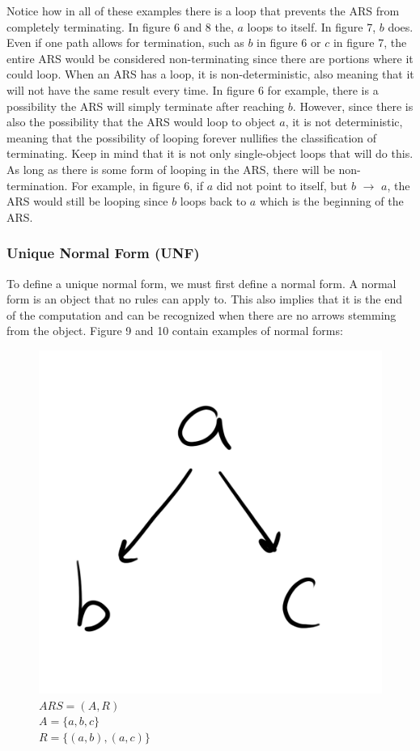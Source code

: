 \documentclass{article}
\begin{document}
\medskip\noindent
Notice how in all of these examples there is a loop that prevents the ARS from completely terminating. In figure 6 and 8 the, $a$ loops to itself. In figure 7, $b$ does. Even if one path allows for termination, such as $b$ in figure 6 or $c$ in figure 7, the entire ARS would be considered non-terminating since there are portions where it could loop. When an ARS has a loop, it is non-deterministic, also meaning that it will not have the same result every time. In figure 6 for example, there is a possibility the ARS will simply terminate after reaching $b$. However, since there is also the possibility that the ARS would loop to object $a$, it is not deterministic, meaning that the possibility of looping forever nullifies the classification of terminating. Keep in mind that it is not only single-object loops that will do this. As long as there is some form of looping in the ARS, there will be non-termination. For example, in figure 6, if $a$ did not point to itself, but $b$ $\rightarrow$ $a$, the ARS would still be looping since $b$ loops back to $a$ which is the beginning of the ARS.


\subsubsection{Unique Normal Form (UNF)}

\medskip\noindent
To define a unique normal form, we must first define a normal form. A normal form is an object that no rules can apply to. This also implies that it is the end of the computation and can be recognized when there are no arrows stemming from the object. Figure 9 and 10 contain examples of normal forms:

\begin{figure}[H]
  \centering
  \includegraphics[scale=0.06]{gen9}
  \caption[] {
    $ARS = (A, R)$
    \\ $A=\{a, b, c\}$
    \\ $R=\{(a, b), (a, c)\}$
    \endtabular}
\end{figure}
\end{document}
